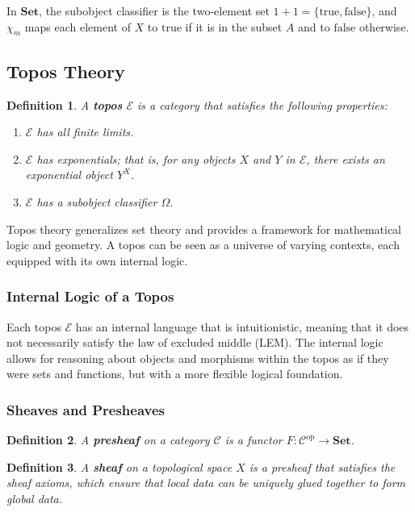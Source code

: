 \documentclass{article}
\newtheorem{definition}{Definition}[section]
\begin{document}
In $\mathbf{Set}$, the subobject classifier is the two-element set $1 + 1 = \{\text{true}, \text{false}\}$, and $\chi_m$ maps each element of $X$ to $\text{true}$ if it is in the subset $A$ and to $\text{false}$ otherwise.

\subsection{Topos Theory}

\begin{definition}
A \textbf{topos} $\mathcal{E}$ is a category that satisfies the following properties:
\begin{enumerate}
    \item $\mathcal{E}$ has all finite limits.
    \item $\mathcal{E}$ has exponentials; that is, for any objects $X$ and $Y$ in $\mathcal{E}$, there exists an exponential object $Y^X$.
    \item $\mathcal{E}$ has a subobject classifier $\Omega$.
\end{enumerate}
\end{definition}

Topos theory generalizes set theory and provides a framework for mathematical logic and geometry. A topos can be seen as a universe of varying contexts, each equipped with its own internal logic.

\subsubsection{Internal Logic of a Topos}

Each topos $\mathcal{E}$ has an internal language that is intuitionistic, meaning that it does not necessarily satisfy the law of excluded middle (LEM). The internal logic allows for reasoning about objects and morphisms within the topos as if they were sets and functions, but with a more flexible logical foundation.

\subsubsection{Sheaves and Presheaves}

\begin{definition}
A \textbf{presheaf} on a category $\mathcal{C}$ is a functor $F \colon \mathcal{C}^{\text{op}} \to \mathbf{Set}$.
\end{definition}

\begin{definition}
A \textbf{sheaf} on a topological space $X$ is a presheaf that satisfies the sheaf axioms, which ensure that local data can be uniquely glued together to form global data.
\end{definition}
\end{document}
